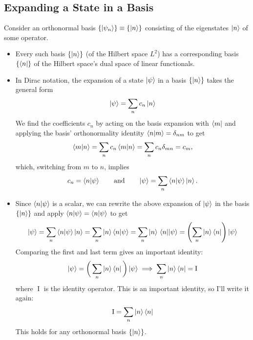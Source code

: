 \documentclass[11pt, a4paper]{article}
\newcommand{\eqtext}[1]{\qquad \text{#1} \qquad}
\newcommand{\p}{\psi}  %
\begin{document}
\subsection{Expanding a State in a Basis}
Consider an orthonormal basis $ \{\ket{\psi_{n}}\} \equiv \{\ket{n}\} $ consisting of the eigenstates $ \ket{n} $ of some operator. 
\begin{itemize}
	\item Every such basis $ \{\ket{n}\} $ (of the Hilbert space $ L^{2} $) has a corresponding basis $ \{\bra{n}\} $ of the Hilbert space's dual space of linear functionals. 
	
	\item In Dirac notation, the expansion of a state $ \ket{\p} $ in a basis $ \{\ket{n}\} $ takes the general form
	\begin{equation*}
		\ket{\psi} = \sum_{n}c_{n} \ket{n}
	\end{equation*}
	We find the coefficients $ c_{n} $ by acting on the basis expansion with $ \bra{m} $ and applying the basis' orthonormality identity $ \braket{n}{m} = \delta_{nm} $ to get
	\begin{equation*}
		\braket{m}{n} = \sum_{n}c_{n} \braket{m}{n} = \sum_{n}c_{n}\delta_{mn} = c_{m},
	\end{equation*}
	which, switching from $ m $ to $ n $, implies
	\begin{equation*}
		c_{n} = \braket{n}{\psi} \eqtext{and} \ket{\psi} = \sum_{n} \braket{n}{\psi} \ket{n}.
	\end{equation*}
	
	\item Since $ \braket{n}{\psi} $ is a scalar, we can rewrite the above expansion of $ \ket{\psi} $ in the basis $ \{\ket{n}\} $ and apply $ \braket{n}{\psi} = \bra{n} \ket{\psi} $ to get
	\begin{equation*}
		\ket{\psi} = \sum_{n} \braket{n}{\psi} \ket{n} = \sum_{n} \ket{n} \braket{n}{\psi} = \sum_{n} \ket{n} \mel{n}{}{\psi} = \left(\sum_{n} \ket{n} \bra{n}\right) \ket{\psi}
	\end{equation*}
	Comparing the first and last term gives an important identity:
	\begin{equation*}
		\ket{\p} = \bigg(\sum_{n} \ket{n} \bra{n}\bigg) \ket{\psi} \implies \sum_{n} \ket{n} \bra{n} = \operatorname{I}
	\end{equation*}
	where $ \operatorname{I} $ is the identity operator. This is an important identity, so I'll write it again:
	\begin{equation*}
		\operatorname{I} = \sum_{n} \ket{n} \bra{n}
	\end{equation*}
	This holds for any orthonormal basis $ \{\ket{n}\} $.

\end{itemize}
\end{document}
